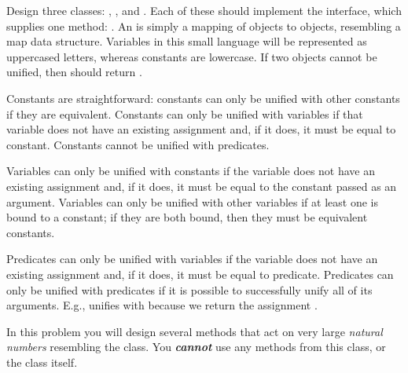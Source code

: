 Design three classes: , , and . Each of these should implement the  interface, which supplies one method: . An  is simply a mapping of  objects to  objects, resembling a map data structure. Variables in this small language will be represented as uppercased letters, whereas constants are lowercase. If two  objects cannot be unified, then  should return .

Constants are straightforward: constants can only be unified with other constants if they are equivalent. Constants can only be unified with variables if that variable does not have an existing assignment and, if it does, it must be equal to  constant. Constants cannot be unified with predicates.

Variables can only be unified with constants if the variable does not have an existing assignment and, if it does, it must be equal to the constant passed as an argument. Variables can only be unified with other variables if at least one is bound to a constant; if they are both bound, then they must be equivalent constants. 

Predicates can only be unified with variables if the variable does not have an existing assignment and, if it does, it must be equal to  predicate. Predicates can only be unified with predicates if it is possible to successfully unify all of its arguments. E.g.,  unifies with  because we return the assignment . 

In this problem you will design several methods that act on very large \textit{natural numbers} resembling the  class. You \textit{\textbf{cannot}} use any methods from this class, or the class itself. 

